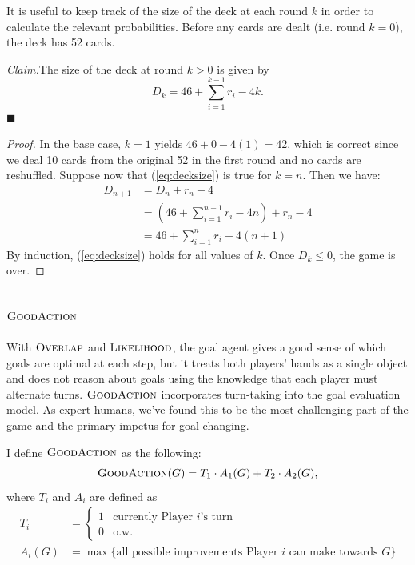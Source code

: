 \documentclass[11pt]{article}
\newcommand{\overlap}{\textsc{Overlap}}
\newcommand{\lkhd}{\textsc{Likelihood}}
\newcommand{\goodaction}{\textsc{GoodAction}}
\newenvironment{claim}[1]{\par\noindent\textit{Claim.}\space#1}{\hfill $\blacksquare$}
\begin{document}
It is useful to keep track of the size of the deck at each round $k$ in order to calculate the relevant probabilities. Before any cards are dealt (i.e. round $k=0$), the deck has 52 cards.

\begin{claim}
The size of the deck at round $k > 0$ is given by
\begin{equation}
  D_k = 46 + \sum_{i=1}^{k-1} r_i - 4k.
\label{eq:decksize} \end{equation}
\end{claim}

\begin{proof}
  In the base case, $k=1$ yields $46+0-4(1) = 42$, which is correct since we deal 10 cards from the original 52 in the first round and no cards are reshuffled. Suppose now that (\ref{eq:decksize}) is true for $k=n$. Then we have:
    \begin{align}
      D_{n+1} &= D_n + r_n - 4 \\
      &= (46 + \sum_{i=1}^{n-1} r_i - 4n) + r_n - 4 \\
      &= 46 + \sum_{i=1}^n r_i - 4(n+1)
    \end{align}
  By induction, (\ref{eq:decksize}) holds for all values of $k$. Once $D_k \leq 0$, the game is over.
\end{proof}

\subsection{$\goodaction$}

With $\overlap$ and $\lkhd$, the goal agent gives a good sense of which goals are optimal at each step, but it treats both players' hands as a single object and does not reason about goals using the knowledge that each player must alternate turns. $\goodaction$ incorporates turn-taking into the goal evaluation model. As expert humans, we've found this to be the most challenging part of the game and the primary impetus for goal-changing.

I define $\goodaction$ as the following:
\begin{equation}
  \goodaction(G) = T_1 \cdot A_1(G) + T_2 \cdot A_2(G),
\label{eq:goodaction} \end{equation}
where $T_i$ and $A_i$ are defined as
\begin{align}
  T_i &= \begin{cases}
    1 & \text{currently Player $i$'s turn} \\
    0 & \text{o.w.}
  \end{cases} \\
  A_i(G) &= \max\{\text{all possible improvements Player $i$ can make towards $G$}\}
\end{align}
\end{document}
